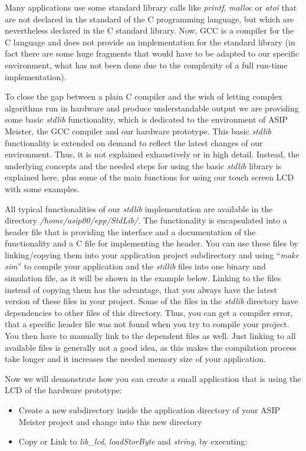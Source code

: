 \documentclass[
]{article}
\begin{document}
Many applications use some standard library calls like \emph{printf},
\emph{malloc} or \emph{atoi} that are not declared in the standard of
the C programming language, but which are nevertheless declared in the C
standard library. Now, GCC is a compiler for the C language and does not
provide an implementation for the standard library (in fact there are
some huge fragments that would have to be adapted to our specific
environment, what has not been done due to the complexity of a full
run-time implementation).

To close the gap between a plain C compiler and the wish of letting
complex algorithms run in hardware and produce understandable output we
are providing some basic \emph{stdlib} functionality, which is dedicated
to the environment of ASIP Meister, the GCC compiler and our hardware
prototype. This basic \emph{stdlib} functionality is extended on demand
to reflect the latest changes of our environment. Thus, it is not
explained exhaustively or in high detail. Instead, the underlying
concepts and the needed steps for using the basic \emph{stdlib} library
is explained here, plus some of the main functions for using our touch
screen LCD with some examples.

All typical functionalities of our \emph{stdlib} implementation are
available in the directory \emph{/home/asip00/epp/StdLib/.} The
functionality is encapsulated into a header file that is providing the
interface and a documentation of the functionality and a C file for
implementing the header. You can use these files by linking/copying them
into your application project subdirectory and using ``\emph{make sim}''
to compile your application and the \emph{stdlib} files into one binary
and simulation file, as it will be shown in the example below. Linking
to the files instead of copying them has the advantage, that you always
have the latest version of these files in your project. Some of the
files in the \emph{stdlib} directory have dependencies to other files of
this directory. Thus, you can get a compiler error, that a specific
header file was not found when you try to compile your project. You then
have to manually link to the dependent files as well. Just linking to
all available files is generally not a good idea, as this makes the
compilation process take longer and it increases the needed memory size
of your application.

Now we will demonstrate how you can create a small application that is
using the LCD of the hardware prototype:

\begin{itemize}
\item
  Create a new subdirectory inside the application directory of your
  ASIP Meister project and change into this new directory
\item
  Copy or Link to \emph{lib\_lcd}, \emph{loadStorByte} and
  \emph{string}, by executing:
\end{itemize}
\end{document}
